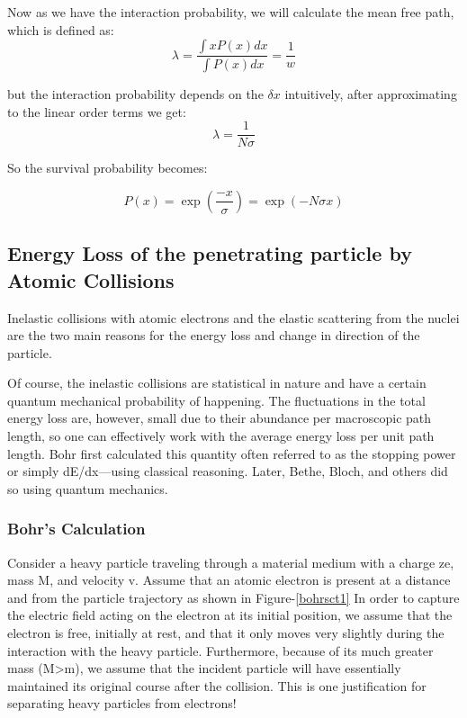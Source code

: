 \documentclass{article}
\begin{document}
\begin{multicols}{2}
Now as we have the interaction probability, we will calculate the mean free
path, which is defined as:
\begin{equation}
    \lambda = \frac{\int x P(x)dx}{\int P(x)dx} = \frac{1}{w}
\end{equation}

but the interaction probability depends on the $\delta x$ intuitively, after 
approximating to the linear order terms we get:
\begin{equation}
    \lambda = \frac{1}{N\sigma}
\end{equation}


So the survival probability becomes:

\begin{equation}
    P(x) = \exp{(\frac{-x}{\sigma})}=\exp{(-N\sigma x)}
\end{equation}


\subsection{Energy Loss of the penetrating particle by Atomic Collisions}

Inelastic collisions with atomic electrons and the elastic scattering from the nuclei
are the two main reasons for the energy loss and change in direction of the particle.

Of course, the inelastic collisions are statistical in nature and have a 
certain quantum mechanical probability of happening. The fluctuations in 
the total energy loss are, however, small due to their abundance per 
macroscopic path length, so one can effectively work with the average 
energy loss per unit path length. Bohr first calculated this quantity 
often referred to as the stopping power or simply dE/dx—using classical 
reasoning. Later, Bethe, Bloch, and others did so using quantum mechanics.


\subsubsection{Bohr's Calculation}

Consider a heavy particle traveling through a material medium with a 
charge ze, mass M, and velocity v. Assume that an atomic electron is 
present at a distance and from the particle trajectory as shown in 
Figure-\ref{bohrsct1} 
In order to capture the electric field acting 
on the electron at its initial position, we assume that the electron 
is free, initially at rest, and that it only moves very slightly during 
the interaction with the heavy particle. Furthermore, because of its much 
greater mass (M>m), we assume that the incident particle will have 
essentially maintained its original course after the collision. 
This is one justification for separating heavy particles from electrons!





\end{multicols}
\end{document}
